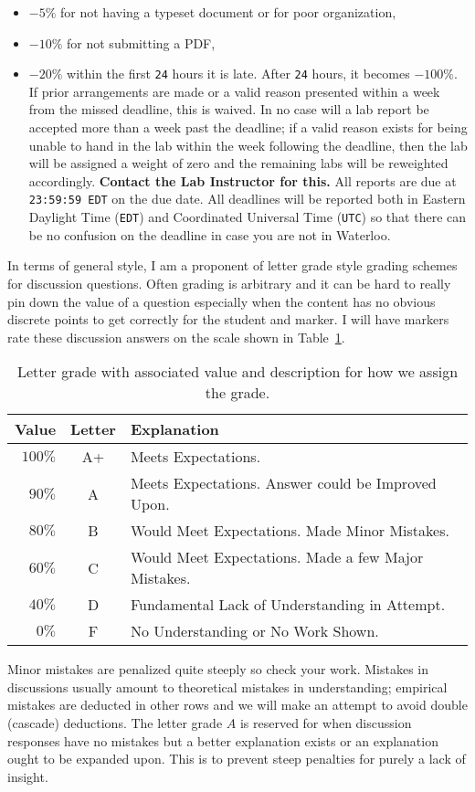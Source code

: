 \begin{itemize}
  \item{
    \(-5\%\) for not having a typeset document or for poor organization,
  }
  \item{
    \(-10\%\) for not submitting a PDF,
  }
  \item{
    \(-20\%\) within the first \texttt{24} hours it is late. After
    \texttt{24} hours, it becomes \(-100\%.\) If prior arrangements are made
    or a valid reason presented within a week from the missed deadline, this
    is waived. In no case will a lab report be accepted more than a week past
    the deadline; if a valid reason exists for being unable to hand in the lab
    within the week following the deadline, then the lab will be assigned a
    weight of zero and the remaining labs will be reweighted accordingly.
    \textbf{Contact the Lab Instructor for this.}
    All reports are due at \texttt{23:59:59 EDT} on the due date.
    All deadlines will be reported both
    in Eastern Daylight Time (\texttt{EDT}) and Coordinated Universal Time
    (\texttt{UTC})
    so that there can be no confusion on the deadline in case you are not
    in Waterloo.
  }
\end{itemize}
%
In terms of general style, I am a proponent of letter grade style
grading schemes for discussion questions.
Often grading is arbitrary and it can be hard to really pin down the value of
a question especially when the content has no obvious discrete points to
get correctly for the student and marker. I will have markers
rate these discussion answers on the scale shown in
Table~\ref{tab:letter-grading}.
%
\begin{table}
\centering
\begin{tabular}{r|c|l}
Value & Letter & Explanation\\ \hline
\(100\%\) & A+ & Meets Expectations.\\ \hline
\(90\%\)  & A & Meets Expectations. Answer could be Improved Upon. \\ \hline
\(80\%\) & B & Would Meet Expectations. Made Minor Mistakes.\\ \hline
\(60\%\) & C & Would Meet Expectations. Made a few Major Mistakes.\\ \hline
\(40\%\) & D & Fundamental Lack of Understanding in Attempt.\\ \hline
\(0\%\) & F & No Understanding or No Work Shown.
\end{tabular}
\caption[Letter Grading Scheme]{Letter grade with associated value and
description for how we assign the grade.}
\label{tab:letter-grading}
\end{table}
%
Minor mistakes are penalized quite steeply so check your work. Mistakes in
discussions usually amount to theoretical mistakes in understanding; empirical
mistakes are deducted in other rows and we will make an attempt to avoid double
(cascade) deductions. The letter grade \(A\) is reserved for when discussion
responses have no mistakes but a better explanation exists or an explanation
ought to be expanded upon. This is to prevent steep penalties for purely a
lack of insight.

